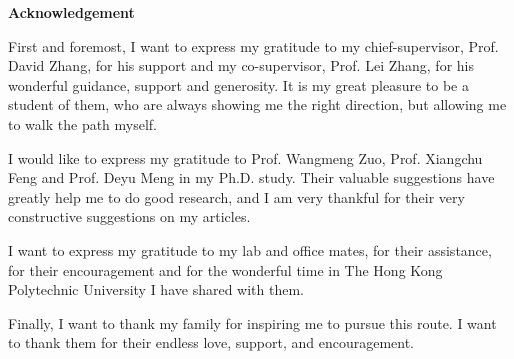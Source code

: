 
\Large\begin{center}
\textbf{Acknowledgement} \end{center}         \normalsize
First and foremost, I want to express my gratitude to my chief-supervisor, Prof. David Zhang, for his support and my co-supervisor, Prof. Lei Zhang, for his wonderful guidance, support and generosity. It is my great pleasure to be a student of them, who are always showing me the right direction, but allowing me to walk the path myself.

I would like to express my gratitude to Prof. Wangmeng Zuo, Prof. Xiangchu Feng
and Prof. Deyu Meng in my Ph.D. study. Their valuable suggestions have greatly help me
to do good research, and I am very thankful for their very constructive suggestions on my
articles. 

I want to express my gratitude to my lab and office mates, for their assistance, for
their encouragement and for the wonderful time in The Hong Kong Polytechnic University I
have shared with them.

Finally, I want to thank my family for inspiring me to pursue this route. I want to
thank them for their endless love, support, and encouragement.